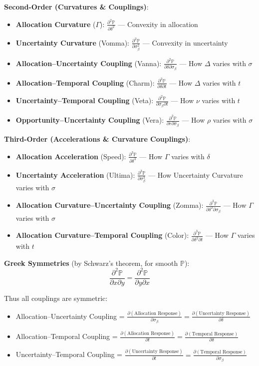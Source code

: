 \textbf{Second-Order (Curvatures \& Couplings)}:
\begin{itemize}
\item \textbf{Allocation Curvature} ($\Gamma$): $\frac{\partial^2 \mathbb{P}}{\partial \delta^2}$ --- Convexity in allocation
\item \textbf{Uncertainty Curvature} (Vomma): $\frac{\partial^2 \mathbb{P}}{\partial \sigma_\beta^2}$ --- Convexity in uncertainty
\item \textbf{Allocation--Uncertainty Coupling} (Vanna): $\frac{\partial^2 \mathbb{P}}{\partial \delta \partial \sigma_\beta}$ --- How $\Delta$ varies with $\sigma$
\item \textbf{Allocation--Temporal Coupling} (Charm): $\frac{\partial^2 \mathbb{P}}{\partial \delta \partial t}$ --- How $\Delta$ varies with $t$
\item \textbf{Uncertainty--Temporal Coupling} (Veta): $\frac{\partial^2 \mathbb{P}}{\partial \sigma_\beta \partial t}$ --- How $\nu$ varies with $t$
\item \textbf{Opportunity--Uncertainty Coupling} (Vera): $\frac{\partial^2 \mathbb{P}}{\partial r \partial \sigma_\beta}$ --- How $\rho$ varies with $\sigma$
\end{itemize}

\textbf{Third-Order (Accelerations \& Curvature Couplings)}:
\begin{itemize}
\item \textbf{Allocation Acceleration} (Speed): $\frac{\partial^3 \mathbb{P}}{\partial \delta^3}$ --- How $\Gamma$ varies with $\delta$
\item \textbf{Uncertainty Acceleration} (Ultima): $\frac{\partial^3 \mathbb{P}}{\partial \sigma_\beta^3}$ --- How Uncertainty Curvature varies with $\sigma$
\item \textbf{Allocation Curvature--Uncertainty Coupling} (Zomma): $\frac{\partial^3 \mathbb{P}}{\partial \delta^2 \partial \sigma_\beta}$ --- How $\Gamma$ varies with $\sigma$
\item \textbf{Allocation Curvature--Temporal Coupling} (Color): $\frac{\partial^3 \mathbb{P}}{\partial \delta^2 \partial t}$ --- How $\Gamma$ varies with $t$
\end{itemize}

\textbf{Greek Symmetries} (by Schwarz's theorem, for smooth $\mathbb{P}$):
\[ \frac{\partial^2 \mathbb{P}}{\partial x \partial y} = \frac{\partial^2 \mathbb{P}}{\partial y \partial x} \]

Thus all couplings are symmetric:
\begin{itemize}
\item Allocation--Uncertainty Coupling = $\frac{\partial (\text{Allocation Response})}{\partial \sigma_\beta} = \frac{\partial (\text{Uncertainty Response})}{\partial \delta}$
\item Allocation--Temporal Coupling = $\frac{\partial (\text{Allocation Response})}{\partial t} = \frac{\partial (\text{Temporal Response})}{\partial \delta}$
\item Uncertainty--Temporal Coupling = $\frac{\partial (\text{Uncertainty Response})}{\partial t} = \frac{\partial (\text{Temporal Response})}{\partial \sigma_\beta}$
\end{itemize}

